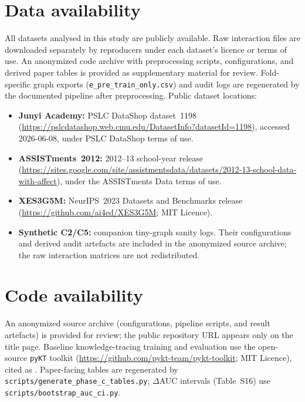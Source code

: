 \documentclass[preprint,10pt,doubleblind]{elsarticle}
\begin{document}
\section*{Data availability}
All datasets analysed in this study are publicly available. Raw
interaction files are downloaded separately by reproducers under each
dataset's licence or terms of use. An anonymized code archive with
preprocessing scripts, configurations, and derived paper tables is
provided as supplementary material for review. Fold-specific graph
exports (\texttt{e\_pre\_train\_only.csv}) and audit logs are regenerated
by the documented pipeline after preprocessing. Public dataset locations:
\begin{itemize}
  \item \textbf{Junyi Academy:} PSLC DataShop dataset~1198
  (\url{https://pslcdatashop.web.cmu.edu/DatasetInfo?datasetId=1198}),
  accessed 2026-06-08, under PSLC DataShop terms of use.
  \item \textbf{ASSISTments~2012:} 2012--13 school-year release
  (\url{https://sites.google.com/site/assistmentsdata/datasets/2012-13-school-data-with-affect}),
  under the ASSISTments Data terms of use.
  \item \textbf{XES3G5M:} NeurIPS~2023 Datasets and Benchmarks release
  (\url{https://github.com/ai4ed/XES3G5M}; MIT Licence).
  \item \textbf{Synthetic C2/C5:} companion tiny-graph sanity logs. Their
  configurations and derived audit artefacts are included in the
  anonymized source archive; the raw interaction matrices are not
  redistributed.
\end{itemize}

\section*{Code availability}
An anonymized source archive (configurations, pipeline scripts, and
result artefacts) is provided for review; the public repository URL
appears only on the title page. Baseline knowledge-tracing training and
evaluation use the open-source \texttt{pyKT} toolkit
(\url{https://github.com/pykt-team/pykt-toolkit}; MIT Licence), cited as
\cite{liu2022pykt}. Paper-facing tables are regenerated by
\texttt{scripts/generate\_phase\_c\_tables.py};
$\Delta$AUC intervals (Table~S16) use
\texttt{scripts/bootstrap\_auc\_ci.py}.



\end{document}
